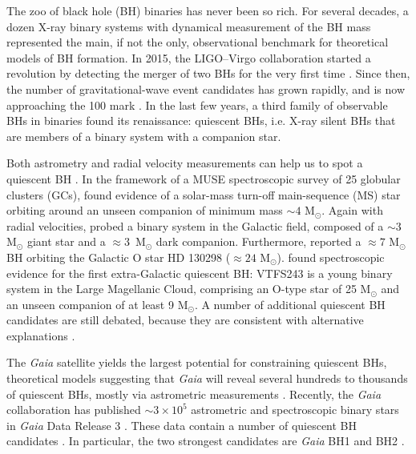 \documentclass[fleqn,usenatbib]{mnras}
\newcommand{\Ms}{M$_\odot$}
\newcommand{\bh}{\textit{Gaia} BH1}
\begin{document}
The zoo of black hole (BH) binaries has never been so rich. For several decades, a dozen X-ray binary systems with dynamical  measurement of the BH mass \citep{oezel2010,farr2011,miller2015} represented the main, if not the only, observational benchmark for theoretical models of BH formation.  
In 2015, the LIGO--Virgo collaboration started a revolution by detecting the merger of two BHs for the very first time \citep{abbottGW150914}. Since then, the number of gravitational-wave event candidates 
has grown rapidly, and is now approaching the 100 mark \citep{abbottGWTC2.1,abbottGWTC3}. In the last few years, a third family of observable BHs in binaries found its renaissance: quiescent BHs, i.e. X-ray silent BHs that are members of a binary system with a companion star.


Both astrometry and radial velocity measurements can help us to spot a quiescent BH \citep{trimble1969}. In the framework of a MUSE spectroscopic survey of 25 globular clusters (GCs), \cite{giesers2018} found evidence of a solar-mass  turn-off main-sequence (MS) star orbiting around an unseen companion of minimum mass $\sim{4}$ M$_\odot${}. Again with radial velocities, \cite{thompson2019} probed a binary system in the Galactic field, composed of a $\sim{3}$ M$_\odot$ giant star and a $\approx{3}$~M$_\odot$ dark companion. 
Furthermore, \cite{mahy2022} reported a $\approx 7$ \Ms{} BH
orbiting the Galactic O star HD 130298 ($\approx 24$ \Ms). 
\cite{shenar2022a} found spectroscopic evidence for the first extra-Galactic quiescent BH: VTFS243 is a young binary system in the Large Magellanic Cloud, comprising an O-type star of 25 M$_\odot$ and an unseen companion of at least 9 M$_\odot$.
A number of additional quiescent BH candidates are still debated, because they are consistent with alternative explanations \citep[e.g.,][]{casares2014,ribo2017,lennon2022,saracino2022,saracino2023}. 


The \textit{Gaia} satellite yields the largest potential for constraining quiescent BHs, theoretical models suggesting that \textit{Gaia} will reveal several hundreds to thousands of quiescent BHs, mostly via astrometric measurements \citep{breivik2017,mashian2017,yalinewich2018,yamaguchi2018,shahaf2019,andrews2019,shikauchi2020,chawla2022,janssens2022,andrews2023,chakrabarti2022}. Recently, the \textit{Gaia} collaboration has published $\sim{3}\times{10^5}$ astrometric and spectroscopic binary stars in \textit{Gaia} Data Release 3 \citep{gaia2022,holl2022,halbwachs2022}. These data contain a number of quiescent BH candidates \citep{shion2022,shahaf2023,andrews2023b}. In particular, the two strongest candidates are \bh{} \citep{elbadry2023a} and BH2 \citep{elbadry2023b,tanikawa2023bh}.
\end{document}
